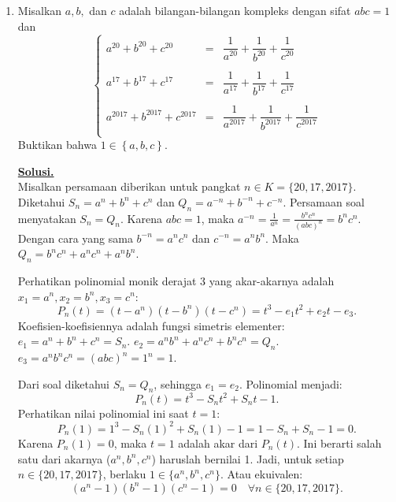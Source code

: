 \documentclass[12pt,twoside]{article}
\newenvironment{solution}
{
	\par\noindent\textbf{\underline{Solusi.}}\\
}
{
	\par
}
\begin{document}
\begin{enumerate}
  \item Misalkan $a,b,$ dan $c$ adalah bilangan-bilangan kompleks dengan sifat $abc = 1$ dan
        \begin{equation*}
          \left\lbrace \begin{array}{rcl}
            a^{20}+b^{20}+c^{20}       & = & \dfrac{1}{a^{20}}+\dfrac{1}{b^{20}}+\dfrac{1}{c^{20}}       \\\\
            a^{17}+b^{17}+c^{17}       & = & \dfrac{1}{a^{17}}+\dfrac{1}{b^{17}}+\dfrac{1}{c^{17}}       \\\\
            a^{2017}+b^{2017}+c^{2017} & = & \dfrac{1}{a^{2017}}+\dfrac{1}{b^{2017}}+\dfrac{1}{c^{2017}} \\
          \end{array} \right.
        \end{equation*}
        Buktikan bahwa $1 \in \left\lbrace a,b,c\right\rbrace$.
        \begin{solution}
          Misalkan persamaan diberikan untuk pangkat $n \in K = \{20, 17, 2017\}$.
          Diketahui $S_n = a^n + b^n + c^n$ dan $Q_n = a^{-n} + b^{-n} + c^{-n}$.
          Persamaan soal menyatakan $S_n = Q_n$.
          Karena $abc = 1$, maka $a^{-n} = \frac{1}{a^n} = \frac{b^n c^n}{(abc)^n} = b^n c^n$.
          Dengan cara yang sama $b^{-n} = a^n c^n$ dan $c^{-n} = a^n b^n$.
          Maka $Q_n = b^n c^n + a^n c^n + a^n b^n$.

          Perhatikan polinomial monik derajat 3 yang akar-akarnya adalah $x_1 = a^n, x_2 = b^n, x_3 = c^n$:
          \[ P_n(t) = (t - a^n)(t - b^n)(t - c^n) = t^3 - e_1 t^2 + e_2 t - e_3. \]
          Koefisien-koefisiennya adalah fungsi simetris elementer:
          $e_1 = a^n + b^n + c^n = S_n$.
          $e_2 = a^n b^n + a^n c^n + b^n c^n = Q_n$.
          $e_3 = a^n b^n c^n = (abc)^n = 1^n = 1$.

          Dari soal diketahui $S_n = Q_n$, sehingga $e_1 = e_2$.
          Polinomial menjadi:
          \[ P_n(t) = t^3 - S_n t^2 + S_n t - 1. \]
          Perhatikan nilai polinomial ini saat $t=1$:
          \[ P_n(1) = 1^3 - S_n(1)^2 + S_n(1) - 1 = 1 - S_n + S_n - 1 = 0. \]
          Karena $P_n(1) = 0$, maka $t=1$ adalah akar dari $P_n(t)$.
          Ini berarti salah satu dari akarnya ($a^n, b^n, c^n$) haruslah bernilai 1.
          Jadi, untuk setiap $n \in \{20, 17, 2017\}$, berlaku $1 \in \{a^n, b^n, c^n\}$.
          Atau ekuivalen:
          \[ (a^n - 1)(b^n - 1)(c^n - 1) = 0 \quad \forall n \in \{20, 17, 2017\}. \]


\end{solution}
\end{enumerate}
\end{document}
